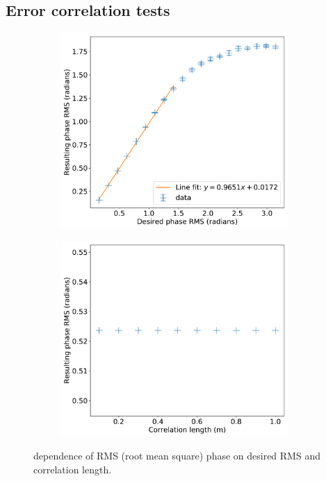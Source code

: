 \documentclass[11pt]{article}
\begin{document}
\subsection{Error correlation tests}\label{sec:res:rms}
\begin{figure}
    \centering
    \begin{subfigure}{0.5\textwidth}
        \centering
        \includegraphics[width=0.95\textwidth]{pictures/rmstest/depth}
        \caption{}\label{fig:rms:depth}
    \end{subfigure}%
    \begin{subfigure}{0.5\textwidth}
        \centering
        \includegraphics[width=0.95\textwidth]{pictures/rmstest/l_corr}
        \caption{}\label{fig:rms:length}
    \end{subfigure}
    \caption{dependence of RMS (root mean square) phase on desired RMS and correlation length.}\label{fig:rms}
\end{figure}
\end{document}
